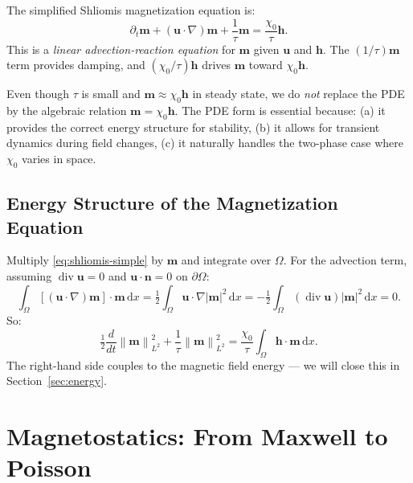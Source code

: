 \documentclass[11pt,a4paper]{article}
\theoremstyle{definition}
\theoremstyle{remark}
\newcommand{\dd}{\,\mathrm{d}}
\newcommand{\dt}{\partial_t}
\newcommand{\dv}{\operatorname{div}}
\newcommand{\grad}{\nabla}
\newcommand{\half}{\tfrac{1}{2}}
\newcommand{\norm}[1]{\left\| #1 \right\|}
\newcommand{\bfu}{\bm{u}}
\newcommand{\bfm}{\bm{m}}
\newcommand{\bfh}{\bm{h}}
\newcommand{\bfn}{\bm{n}}
\begin{document}
\begin{keypoint}
The simplified Shliomis magnetization equation is:
\begin{equation}
  \label{eq:shliomis-simple}
  \boxed{
    \dt\bfm + (\bfu \cdot \grad)\bfm + \frac{1}{\tau}\bfm
    = \frac{\chi_0}{\tau}\bfh.
  }
\end{equation}
This is a \emph{linear advection-reaction equation} for $\bfm$ given
$\bfu$ and $\bfh$. The $(1/\tau)\bfm$ term provides damping, and
$(\chi_0/\tau)\bfh$ drives $\bfm$ toward $\chi_0\bfh$.
\end{keypoint}

\begin{derivnote}
Even though $\tau$ is small and $\bfm \approx \chi_0\bfh$ in steady
state, we do \emph{not} replace the PDE by the algebraic relation
$\bfm = \chi_0\bfh$. The PDE form is essential because:
(a) it provides the correct energy structure for stability,
(b) it allows for transient dynamics during field changes,
(c) it naturally handles the two-phase case where $\chi_0$ varies in space.
\end{derivnote}

\subsection{Energy Structure of the Magnetization Equation}

Multiply \eqref{eq:shliomis-simple} by $\bfm$ and integrate over $\Omega$.
For the advection term, assuming $\dv\bfu = 0$ and $\bfu \cdot \bfn = 0$
on $\partial\Omega$:
\[
  \int_\Omega [(\bfu \cdot \grad)\bfm] \cdot \bfm \dd x
  = \half \int_\Omega \bfu \cdot \grad|\bfm|^2 \dd x
  = -\half \int_\Omega (\dv\bfu)|\bfm|^2 \dd x = 0.
\]
So:
\begin{equation}
  \label{eq:mag-energy-test}
  \half\frac{d}{dt}\norm{\bfm}^2_{L^2}
  + \frac{1}{\tau}\norm{\bfm}^2_{L^2}
  = \frac{\chi_0}{\tau}\int_\Omega \bfh \cdot \bfm \dd x.
\end{equation}
The right-hand side couples to the magnetic field energy — we will close
this in Section~\ref{sec:energy}.


\section{Magnetostatics: From Maxwell to Poisson}
\label{sec:maxwell}
\end{document}
